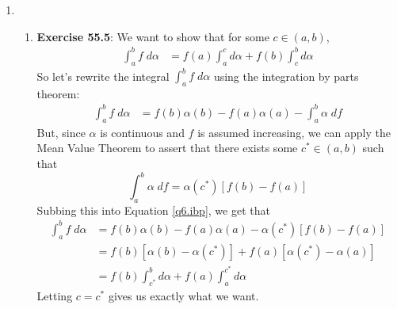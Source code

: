 \documentclass[12pt]{article}
\theoremstyle{plain}
\theoremstyle{definition}
\theoremstyle{remark}
\begin{document}
\begin{enumerate}
\item 
\begin{enumerate}
\item \textbf{Exercise 55.5}: We want to show that for some $c\in(a,b)$,
\begin{align*}
    \int^b_a f\;d\alpha &= f(a)\int^c_a d\alpha 
        + f(b) \int^b_c d\alpha 
\end{align*}
So let's rewrite the integral $\int^b_a f\;d\alpha$ using the integration by parts theorem:
\begin{align}
    \label{q6.ibp}
    \int^b_a f\;d\alpha  
        &= f(b) \alpha(b) - f(a)\alpha(a) - \int^b_a\alpha \; df
\end{align}
But, since $\alpha$ is continuous and $f$ is assumed increasing, we can apply the Mean Value Theorem to assert that there exists some $c^*\in(a,b)$ such that 
\begin{equation}
    \int^b_a \alpha\;df = \alpha(c^*)[f(b)-f(a)]
\end{equation}
Subbing this into Equation \ref{q6.ibp}, we get that
\begin{align*}
    \int^b_a f\;d\alpha  
        &= f(b) \alpha(b)-f(a)\alpha(a)-\alpha(c^*)[f(b)-f(a)]\\
        &= f(b) \left[\alpha(b)-\alpha(c^*)\right]
            + f(a)\left[\alpha(c^*)-\alpha(a)\right]\\
        &= f(b) \int^b_{c^*} d\alpha
            + f(a)\int^{c^*}_a d\alpha
\end{align*}
Letting $c=c^*$ gives us exactly what we want.



\end{enumerate}
\end{enumerate}
\end{document}
